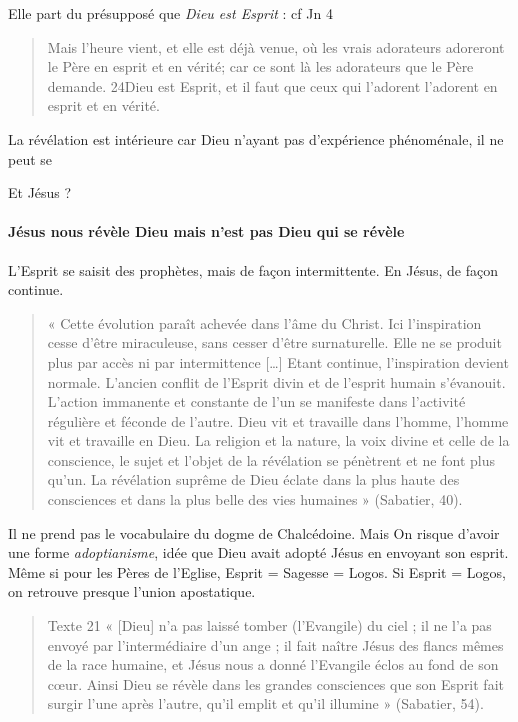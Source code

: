 Elle part du présupposé que \textit{Dieu est Esprit} : 
cf Jn 4
\begin{quote}
    Mais l'heure vient, et elle est déjà venue, où les vrais adorateurs adoreront le Père en esprit et en vérité; car ce sont là les adorateurs que le Père demande. 24Dieu est Esprit, et il faut que ceux qui l'adorent l'adorent en esprit et en vérité.
\end{quote}

La révélation est intérieure car Dieu n'ayant pas d'expérience phénoménale, il ne peut se

Et Jésus ?
\paragraph{Jésus nous révèle Dieu mais n'est pas Dieu qui se révèle}
L'Esprit se saisit des prophètes, mais de façon intermittente.
En Jésus, de façon continue.

\begin{quote}
    « Cette évolution paraît achevée dans l’âme du Christ. Ici l’inspiration cesse d’être miraculeuse, sans cesser d’être surnaturelle. Elle ne se produit plus par accès ni par intermittence […] Etant continue, l’inspiration devient normale. L’ancien conflit de l’Esprit divin et de l’esprit humain s’évanouit. L’action immanente et constante de l’un se manifeste dans l’activité régulière et féconde de l’autre. Dieu vit et travaille dans l’homme, l’homme vit et travaille en Dieu. La religion et la nature, la voix divine et celle de la conscience, le sujet et l’objet de la révélation se pénètrent et ne font plus qu’un. La révélation suprême de Dieu éclate dans la plus haute des  consciences et dans la plus belle des vies humaines » (Sabatier, 40). 
\end{quote}
Il ne prend pas le vocabulaire du dogme de Chalcédoine. Mais On risque d'avoir une forme \textit{adoptianisme}, idée que Dieu avait adopté Jésus en envoyant son esprit.
Même si pour les Pères de l'Eglise, Esprit = Sagesse = Logos. Si Esprit = Logos, on retrouve presque l'union apostatique. 


\begin{quote}
    Texte 21 « [Dieu] n’a pas laissé tomber (l’Evangile) du ciel ; il ne l’a pas envoyé par l’intermédiaire d’un ange ; il fait naître Jésus des flancs mêmes de la race humaine, et Jésus nous a donné l’Evangile éclos au fond de son cœur. Ainsi Dieu se révèle dans les grandes consciences que son Esprit fait surgir l’une après l’autre, qu’il emplit et qu’il illumine » (Sabatier, 54). 
\end{quote}

